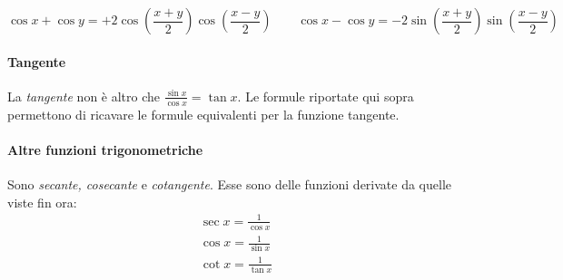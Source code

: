  \begin{form}
 \[
 \cos x +\cos y=+2\cos(\frac{x+y}{2})\cos(\frac{x-y}{2})
 \qquad
 \cos x -\cos y=-2\sin(\frac{x+y}{2})\sin(\frac{x-y}{2})
 \]
 \end{form}
 
 \paragraph{Tangente}
 La \textit{tangente} non è altro che $\frac{\sin x}{\cos x}= \tan x$. Le formule riportate qui sopra permettono di ricavare le formule equivalenti per la funzione tangente.
 
 \paragraph{Altre funzioni trigonometriche}
 Sono \textit{secante, cosecante} e \textit{cotangente}.  Esse sono delle funzioni derivate da quelle viste fin ora:\\
\begin{gather}
 \sec x=\frac{1}{\cos x}\\
 \cos x=\frac{1}{\sin x}\\
 \cot x=\frac{1}{\tan x}\\
\end{gather} 

